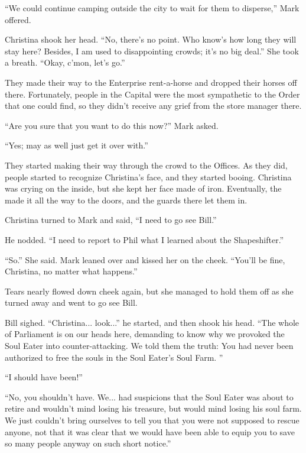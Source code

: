 \documentclass[showtrims,b6paper,draft,10pt]{memoir}
\begin{document}
``We could continue camping outside the city to wait for them to disperse,'' Mark offered.

Christina shook her head.  ``No, there's no point.  Who know's how long they will stay here?  Besides, I am used to disappointing crowds;  it's no big deal.''  She took a breath.  ``Okay, c'mon, let's go.''

They made their way to the Enterprise rent-a-horse and dropped their horses off there.  Fortunately, people in the Capital were the most sympathetic to the Order that one could find, so they didn't receive any grief from the store manager there.

``Are you sure that you want to do this now?''  Mark asked.

``Yes;  may as well just get it over with.''

They started making their way through the crowd to the Offices.  As they did, people started to recognize Christina's face, and they started booing.  Christina was crying on the inside, but she kept her face made of iron.  Eventually, the made it all the way to the doors, and the guards there let them in.

Christina turned to Mark and said, ``I need to go see Bill.''

He nodded.  ``I need to report to Phil what I learned about the Shapeshifter.''

``So.''  She said.  Mark leaned over and kissed her on the cheek.  ``You'll be fine, Christina, no matter what happens.''

Tears nearly flowed down cheek again, but she managed to hold them off as she turned away and went to go see Bill.

\timeskip

Bill sighed.  ``Christina... look...'' he started, and then shook his head.  ``The whole of Parliament is on our heads here, demanding to know why we provoked the Soul Eater into counter-attacking.  We told them the truth:  You had never been authorized to free the souls in the Soul Eater's Soul Farm.  ''

``I should have been!''

``No, you shouldn't have.  We... had suspicions that the Soul Eater was about to retire and wouldn't mind losing his treasure, but would mind losing his soul farm.  We just couldn't bring ourselves to tell you that you were not supposed to rescue anyone, not that it was clear that we would have been able to equip you to save so many people anyway on such short notice.''
\end{document}
